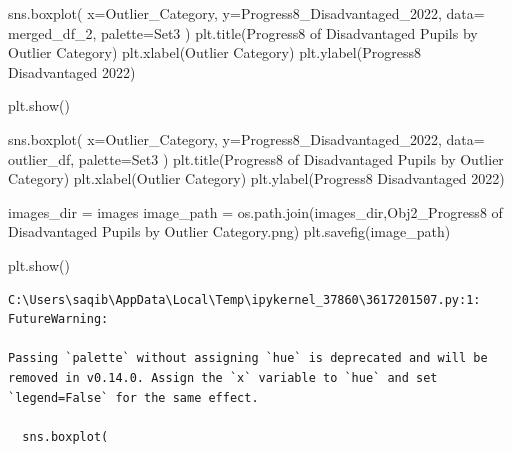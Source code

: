 \documentclass[
  letterpaper,
  DIV=11,
  numbers=noendperiod]{scrartcl}
\newenvironment{Shaded}{\begin{snugshade}}{\end{snugshade}}
\newcommand{\NormalTok}[1]{\textcolor[rgb]{0.00,0.23,0.31}{#1}}
\newcommand{\OperatorTok}[1]{\textcolor[rgb]{0.37,0.37,0.37}{#1}}
\newcommand{\StringTok}[1]{\textcolor[rgb]{0.13,0.47,0.30}{#1}}
\begin{document}
\begin{Shaded}
\begin{Highlighting}[]
\NormalTok{sns.boxplot(}
\NormalTok{    x}\OperatorTok{=}\StringTok{\textquotesingle{}Outlier\_Category\textquotesingle{}}\NormalTok{, }
\NormalTok{    y}\OperatorTok{=}\StringTok{\textquotesingle{}Progress8\_Disadvantaged\_2022\textquotesingle{}}\NormalTok{, }
\NormalTok{    data}\OperatorTok{=}\NormalTok{ merged\_df\_2,  }
\NormalTok{    palette}\OperatorTok{=}\StringTok{\textquotesingle{}Set3\textquotesingle{}}
\NormalTok{)}
\NormalTok{plt.title(}\StringTok{\textquotesingle{}Progress8 of Disadvantaged Pupils by Outlier Category\textquotesingle{}}\NormalTok{)}
\NormalTok{plt.xlabel(}\StringTok{\textquotesingle{}Outlier Category\textquotesingle{}}\NormalTok{)}
\NormalTok{plt.ylabel(}\StringTok{\textquotesingle{}Progress8 Disadvantaged 2022\textquotesingle{}}\NormalTok{)}

\NormalTok{plt.show()}


\NormalTok{sns.boxplot(}
\NormalTok{    x}\OperatorTok{=}\StringTok{\textquotesingle{}Outlier\_Category\textquotesingle{}}\NormalTok{, }
\NormalTok{    y}\OperatorTok{=}\StringTok{\textquotesingle{}Progress8\_Disadvantaged\_2022\textquotesingle{}}\NormalTok{, }
\NormalTok{    data}\OperatorTok{=}\NormalTok{ outlier\_df,  }
\NormalTok{    palette}\OperatorTok{=}\StringTok{\textquotesingle{}Set3\textquotesingle{}}
\NormalTok{)}
\NormalTok{plt.title(}\StringTok{\textquotesingle{}Progress8 of Disadvantaged Pupils by Outlier Category\textquotesingle{}}\NormalTok{)}
\NormalTok{plt.xlabel(}\StringTok{\textquotesingle{}Outlier Category\textquotesingle{}}\NormalTok{)}
\NormalTok{plt.ylabel(}\StringTok{\textquotesingle{}Progress8 Disadvantaged 2022\textquotesingle{}}\NormalTok{)}

\NormalTok{images\_dir }\OperatorTok{=} \StringTok{\textquotesingle{}images\textquotesingle{}}
\NormalTok{image\_path }\OperatorTok{=}\NormalTok{ os.path.join(images\_dir,}\StringTok{\textquotesingle{}Obj2\_Progress8 of Disadvantaged Pupils by Outlier Category.png\textquotesingle{}}\NormalTok{)}
\NormalTok{plt.savefig(image\_path)}

\NormalTok{plt.show()}
\end{Highlighting}
\end{Shaded}

\begin{verbatim}
C:\Users\saqib\AppData\Local\Temp\ipykernel_37860\3617201507.py:1: FutureWarning: 

Passing `palette` without assigning `hue` is deprecated and will be removed in v0.14.0. Assign the `x` variable to `hue` and set `legend=False` for the same effect.

  sns.boxplot(
\end{verbatim}
\end{document}
